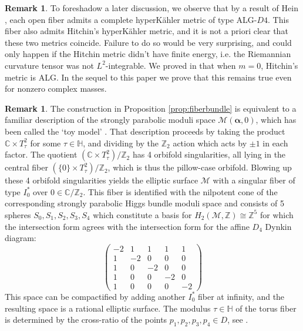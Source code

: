 \documentclass[12pt,letterpaper,reqno]{amsart}
\def\mathbf#1{#1}%
\theoremstyle{remark}
\theoremstyle{definition}
\newtheorem{rem}[thm]{Remark}
\numberwithin{thm}{section}
\numberwithin{equation}{section}
\numberwithin{figure}{section}
\newcommand{\cM}{\ensuremath{\mathcal M}}
\newcommand{\C}{\ensuremath{\mathbb C}}
\newcommand{\Z}{\ensuremath{\mathbb Z}}
\newcommand{\calM}{\mathcal M}
\newcommand{\bsa}{\boldsymbol{\alpha}}
\newcommand{\bfm}{\mathbf{m}}
\begin{document}
 
\begin{rem} To foreshadow a later discussion, we observe that by a result of Hein \cite{hein43}, each open fiber admits a complete hyperK\"ahler metric of type ALG-$D4$. 
This fiber also admits Hitchin's hyperK\"ahler metric, and it is not a priori clear that these two metrics coincide. Failure to do so would be very surprising, and
could only happen if the Hitchin metric didn't have finite energy, i.e. the Riemannian curvature tensor was not $L^2$-integrable.  We proved in \cite{FMSW} that when $\bfm = \mathbf{0}$, Hitchin's metric
is ALG. In the sequel to this paper we prove that this remains true even for nonzero complex masses.
\end{rem} 


\begin{rem}
The construction in Proposition \ref{prop:fiberbundle}  is equivalent to a familiar description of the strongly parabolic moduli space $\calM(\bsa,\mathbf{0})$, which has
been called the `toy model' \cite{MR1650276}.  That description proceeds by taking the product $\C \times T^2_\tau$ for some $\tau \in \mathbb{H}$,
and dividing by the $\Z_2$ action which acts by $\pm 1$ in each factor. The quotient $(\C \times T^2_\tau) / \Z_2$ has 4 orbifold singularities, all
lying in the central fiber $(\{0\} \times T^2_\tau)/\Z_2$, which is thus the pillow-case orbifold. Blowing up these 4 orbifold singularities yields the elliptic 
surface $\calM$ with a singular fiber of type $I_0^*$ over $0 \in \C/\Z_2$. This fiber is identified with the nilpotent cone of the corresponding strongly 
parabolic Higgs bundle moduli space and consists of 5 spheres $S_0,S_1,S_2,S_3,S_4$ which constitute a basis for $H_2(\cM, \Z) \cong \Z^5 $ 
for which the intersection form agrees with the intersection form for the affine $D_4$ Dynkin diagram: 
\begin{equation}\label{eq:intersectionform}
 \begin{pmatrix}
 -2 & 1 & 1  & 1 & 1 \\ 1 & -2 & 0 & 0 & 0 \\ 1 & 0 & -2 & 0 & 0 \\ 1 & 0 & 0 & -2 & 0 \\ 1 & 0 & 0 & 0 & -2
\end{pmatrix}
\end{equation}
This space can be compactified by adding another $I_0^*$ fiber at infinity, and the resulting space is a rational elliptic surface. The modulus $\tau \in \mathbb{H}$ 
of the torus fiber is determined by the cross-ratio of the points $p_1, p_2, p_3, p_4 \in D$, see  \cite{FMSW}.
\end{rem}
\end{document}
